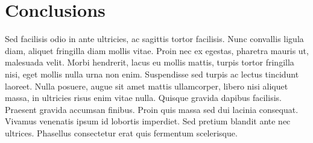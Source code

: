 \chapter{Conclusions}

Sed facilisis odio in ante ultricies, ac sagittis tortor facilisis. Nunc convallis ligula diam, aliquet fringilla diam mollis vitae. Proin nec ex egestas, pharetra mauris ut, malesuada velit. Morbi hendrerit, lacus eu mollis mattis, turpis tortor fringilla nisi, eget mollis nulla urna non enim. Suspendisse sed turpis ac lectus tincidunt laoreet. Nulla posuere, augue sit amet mattis ullamcorper, libero nisi aliquet massa, in ultricies risus enim vitae nulla. Quisque gravida dapibus facilisis. Praesent gravida accumsan finibus. Proin quis massa sed dui lacinia consequat. Vivamus venenatis ipsum id lobortis imperdiet. Sed pretium blandit ante nec ultrices. Phasellus consectetur erat quis fermentum scelerisque.